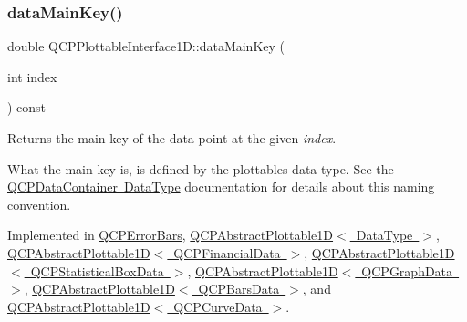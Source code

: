 \mbox{\label{class_q_c_p_plottable_interface1_d_a2bd60daaac046945fead558cbd83cf73}} 
\subsubsection{\texorpdfstring{dataMainKey()}{dataMainKey()}}
{\footnotesize\ttfamily double Q\+C\+P\+Plottable\+Interface1\+D\+::data\+Main\+Key (\begin{DoxyParamCaption}\item[{int}]{index }\end{DoxyParamCaption}) const\hspace{0.3cm}{\ttfamily [pure virtual]}}

Returns the main key of the data point at the given {\itshape index}.

What the main key is, is defined by the plottable\textquotesingle{}s data type. See the \mbox{\hyperlink{class_q_c_p_data_container_qcpdatacontainer-datatype}{Q\+C\+P\+Data\+Container Data\+Type}} documentation for details about this naming convention. 

Implemented in \mbox{\hyperlink{class_q_c_p_error_bars_a7cba420078adc523efa59fb8c6ca23e0}{Q\+C\+P\+Error\+Bars}}, \mbox{\hyperlink{class_q_c_p_abstract_plottable1_d_aeb156ebf5d3c8de906b428be30733ad8}{Q\+C\+P\+Abstract\+Plottable1\+D$<$ Data\+Type $>$}}, \mbox{\hyperlink{class_q_c_p_abstract_plottable1_d_aeb156ebf5d3c8de906b428be30733ad8}{Q\+C\+P\+Abstract\+Plottable1\+D$<$ Q\+C\+P\+Financial\+Data $>$}}, \mbox{\hyperlink{class_q_c_p_abstract_plottable1_d_aeb156ebf5d3c8de906b428be30733ad8}{Q\+C\+P\+Abstract\+Plottable1\+D$<$ Q\+C\+P\+Statistical\+Box\+Data $>$}}, \mbox{\hyperlink{class_q_c_p_abstract_plottable1_d_aeb156ebf5d3c8de906b428be30733ad8}{Q\+C\+P\+Abstract\+Plottable1\+D$<$ Q\+C\+P\+Graph\+Data $>$}}, \mbox{\hyperlink{class_q_c_p_abstract_plottable1_d_aeb156ebf5d3c8de906b428be30733ad8}{Q\+C\+P\+Abstract\+Plottable1\+D$<$ Q\+C\+P\+Bars\+Data $>$}}, and \mbox{\hyperlink{class_q_c_p_abstract_plottable1_d_aeb156ebf5d3c8de906b428be30733ad8}{Q\+C\+P\+Abstract\+Plottable1\+D$<$ Q\+C\+P\+Curve\+Data $>$}}.

\mbox{\label{class_q_c_p_plottable_interface1_d_af6330919e8023277d08c958a6074fc76}} 
